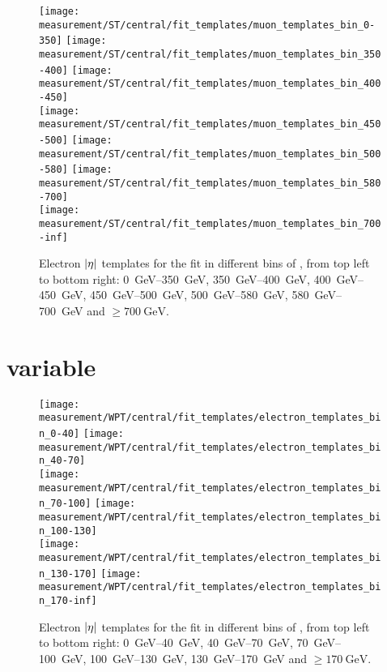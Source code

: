 \begin{figure}[!htbp]
  \centering
    {\texttt{[image: measurement/ST/central/fit\_templates/muon\_templates\_bin\_0-350]}}
    {\texttt{[image: measurement/ST/central/fit\_templates/muon\_templates\_bin\_350-400]}}
    {\texttt{[image: measurement/ST/central/fit\_templates/muon\_templates\_bin\_400-450]}}\\
    {\texttt{[image: measurement/ST/central/fit\_templates/muon\_templates\_bin\_450-500]}}
    {\texttt{[image: measurement/ST/central/fit\_templates/muon\_templates\_bin\_500-580]}}
    {\texttt{[image: measurement/ST/central/fit\_templates/muon\_templates\_bin\_580-700]}}\\
    {\texttt{[image: measurement/ST/central/fit\_templates/muon\_templates\_bin\_700-inf]}}
    \caption{Electron $\lvert \eta \rvert$ templates for the fit in different bins of \ST,
    from top left to bottom right: \SIrange{0}{350}{\GeV}, \SIrange{350}{400}{\GeV},
    \SIrange{400}{450}{\GeV}, \SIrange{450}{500}{\GeV}, \SIrange{500}{580}{\GeV},
    \SIrange{580}{700}{\GeV} and $\geq \SI{700}{\GeV}$.}
    \label{fig:fit_templates_ST_muon}
\end{figure}

\newpage
\section*{\WPT variable}

\begin{figure}[!htbp]
  \centering
    \hspace*{\fill}
    {\texttt{[image: measurement/WPT/central/fit\_templates/electron\_templates\_bin\_0-40]}}\hfill
    {\texttt{[image: measurement/WPT/central/fit\_templates/electron\_templates\_bin\_40-70]}}
    \hspace*{\fill} \\
    \hspace*{\fill}
    {\texttt{[image: measurement/WPT/central/fit\_templates/electron\_templates\_bin\_70-100]}}\hfill
    {\texttt{[image: measurement/WPT/central/fit\_templates/electron\_templates\_bin\_100-130]}}
    \hspace*{\fill} \\
    \hspace*{\fill}
    {\texttt{[image: measurement/WPT/central/fit\_templates/electron\_templates\_bin\_130-170]}}\hfill
    {\texttt{[image: measurement/WPT/central/fit\_templates/electron\_templates\_bin\_170-inf]}}
    \hspace*{\fill}
    \caption{Electron $\lvert \eta \rvert$ templates for the fit in different bins of \WPT,
    from top left to bottom right: \SIrange{0}{40}{\GeV}, \SIrange{40}{70}{\GeV},
    \SIrange{70}{100}{\GeV}, \SIrange{100}{130}{\GeV}, \SIrange{130}{170}{\GeV} and $\geq \SI{170}{\GeV}$.}
    \label{fig:fit_tempaltes_WPT_electron}
\end{figure}

